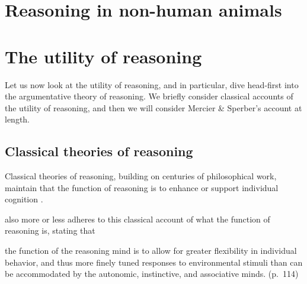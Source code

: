 \section{Reasoning in non-human animals}
\label{sec:reasoning-nha}


\section{The utility of reasoning}

Let us now look at the utility of reasoning, and in particular, dive head-first into the argumentative theory of reasoning.
We briefly consider classical accounts of the utility of reasoning, and then we will consider Mercier \& Sperber's account at length.

\subsection{Classical theories of reasoning}


Classical theories of reasoning, building on centuries of philosophical work, maintain that the function of reasoning is to enhance or support individual cognition \citep{MS11}.



\citet{Goel22} also more or less adheres to this classical account of what the function of reasoning is, stating that
\begin{quoting}
    the function of the reasoning mind is to allow for greater flexibility in individual behavior, and thus more finely tuned responses to environmental stimuli than can be accommodated by the autonomic, instinctive, and associative minds.
    \hfill (p.~114)
\end{quoting}

